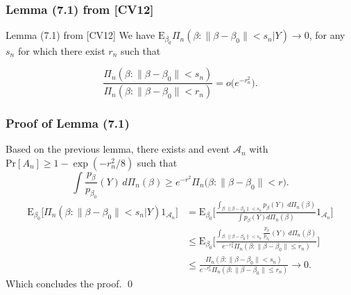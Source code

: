 \documentclass[usenames,dvipsnames]{beamer}
\newcommand{\given}{|}
\newcommand{\E}{\mathrm{E}}
\renewcommand{\b}{\beta}
\newcommand{\te}{\beta}
\newcommand{\q}{\beta}
\begin{document}
\begin{frame}
	\frametitle{Lemma (7.1) from [CV12]}
	
	\begin{exampleblock}{Lemma (7.1) from [CV12]}
		\label{lemlb}
		We have $\E_{\q_0}\Pi_n (\q:\|\q-\q_0\|<s_n\given Y
		)\to0$,
		for any $s_n$ for which there exist $r_n$ such that
		
		\[
		\frac{\Pi_n (\q:\|\q-\q_0\|< s_n )} {
			\Pi_n (\q:\|\q-\q_0\|< r_n )}=o\bigl(e^{-r_n^2}\bigr).
		\]
	\end{exampleblock}

\end{frame}

\begin{frame}
	\frametitle{Proof of Lemma (7.1)}
	\begin{small}
	Based on the previous lemma, there exists and event $\mathcal{A}_n$ with $\mathrm{Pr}[A_n]\geq 1-\exp(-r_n^2/8)$ such that \[
	\int\frac{p_{\te}}{p_{\te_0}}(Y) \,d\Pi_n(\te) \geq e^{-r^2}
	\Pi_n\bigl(\q:\|\q-\q_0\|<r \bigr).
	\]	
	\begin{align*}
		\E_{\q_0}\bigg[\Pi_n(\b: \|\b - \b_0\|<s_n|Y ) 1_{\mathcal{A}_n}\bigg] &= \E_{\q_0} \Bigg[\frac{\int_{\b: \|\b-\b_0\|<s_n}p_{\b}(Y)\; d\Pi_n(\b)}{\int p_\b (Y) d\Pi_n(\b)}  1_{\mathcal{A}_n} \Bigg]\\
		&\leq 
		\E_{\q_0} \Bigg[\frac{\int_{\b: \|\b-\b_0\|<s_n}\frac{p_{\b}}{p_{\b_0}}(Y)\; d\Pi_n(\b)}{e^{-r_n^2}\Pi_n(\b: \|\b-\b_0\|\leq r_n)}   \Bigg]\\
		&\leq \frac{\Pi_n(\b: \|\b-\b_0\|<s_n)}{e^{-r_n^2}\Pi_n(\b: \|\b-\b_0\|\leq r_n)}  \to 0.
	\end{align*}
	Which concludes the proof. \qed
		\end{small}
\end{frame}
\end{document}
